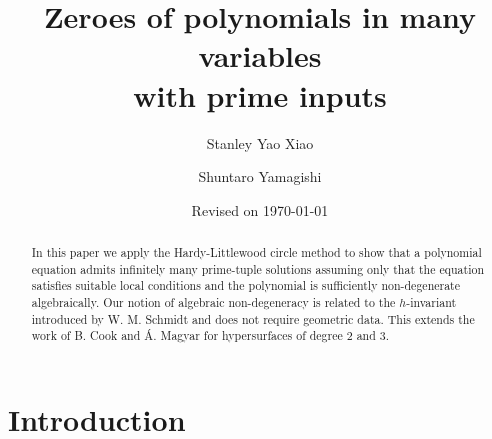\documentclass[12pt]{amsart}
\theoremstyle{definition}
\theoremstyle{remark}
\numberwithin{equation}{section}
\begin{document}
\title[]{Zeroes of polynomials in many variables \\ with prime inputs}

\author{Stanley Yao Xiao}
\address{Department of Pure Mathematics \\
University of Waterloo \\
Waterloo, ON\\  N2L 3G1 \\
Canada}

\author{Shuntaro Yamagishi}
\address{Department of Mathematics \& Statistics \\
Queen's University \\
Kingston, ON\\  K7L 3N6 \\
Canada}
\indent

\date{Revised on \today}

\begin{abstract}
In this paper we apply the Hardy-Littlewood circle method to show that a polynomial equation admits infinitely many prime-tuple solutions assuming only that the equation satisfies suitable local conditions and the polynomial is sufficiently non-degenerate algebraically.
Our notion of algebraic non-degeneracy is related to the $h$-invariant introduced by W. M. Schmidt and does not require geometric data. This extends the work of B. Cook and \'{A}. Magyar \cite{CM} for hypersurfaces of degree $2$ and $3$.
\end{abstract}



\maketitle

\section{Introduction}
\end{document}
